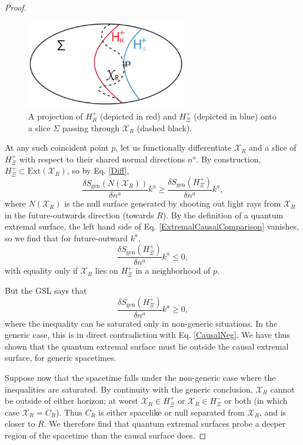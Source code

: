 \documentclass[12pt]{article}
\theoremstyle{remark}
\numberwithin{equation}{section}
\numberwithin{equation}{section}
\begin{document}
\begin{proof}
\begin{figure}[t]
\begin{center}
\includegraphics[width=7cm]{CausalSurfaceDefv2.pdf} 
\caption{\small{A projection of $H^{+}_{R}$ (depicted in red) and $H^{+}_{\Xi}$ (depicted in blue) onto a slice $\Sigma$ passing through $\mathcal{X}_{R}$ (dashed black).}}
\label{Daleth}
\end{center}
\end{figure}
At any such coincident point $p$, let us functionally differentiate $\mathcal{X}_{R}$ and a slice of $H^+_\Xi$ with respect to their shared normal directions $n^{a}$.  By construction, $H^+_\Xi\subset \text{Ext}(\mathcal{X}_{R})$, so by Eq. \ref{Diff},
\begin{equation}\frac{\delta S_{\text{gen}} (N(\mathcal{X}_{R}))}{\delta n^{a}}k^{a} \geq \frac{\delta S_{\text{gen}} (H^+_\Xi)}{\delta n^{a}}k^{a},  \label{ExtremalCausalComparison}
\end{equation}
where $N(\mathcal{X}_{R})$ is the null surface generated by shooting out light rays from $\mathcal{X}_{R}$ in the future-outwards direction (towards $R$).  By the definition of a quantum extremal surface, the left hand side of Eq. \ref{ExtremalCausalComparison} vanishes, so we find that for future-outward $k^a$,
\begin{equation}
\frac{\delta  S_{\text{gen}} (H^+_\Xi)}{\delta n^{a}}k^{a} \leq 0 \label{CausalNeg},
\end{equation}
with equality only if $\mathcal{X}_{R}$ lies on $H^+_\Xi$ in a neighborhood of $p$.

But the GSL says that
\begin{equation} \frac{\delta  S_{\text{gen}} (H^+_\Xi)}{\delta n^{a}}k^{a} \geq  0, \label{CausalFut} \end{equation}
where the inequality can be saturated only in non-generic situations.  In the generic case, this is in direct contradiction with Eq. \ref{CausalNeg}.  We have thus shown that the quantum extremal surface must lie outside the causal extremal surface, for generic spacetimes.

Suppose now that the spacetime falls under the non-generic case where the inequalities are saturated.  By continuity with the generic conclusion, $\mathcal{X}_{R}$ cannot be outside of either horizon; at worst $\mathcal{X}_{R} \in H^+_\Xi$ or $\mathcal{X}_{R} \in H^-_\Xi$ or both (in which case $\mathcal{X}_{R} = C_R$).  Thus $C_R$ is either spacelike or null separated from $\mathcal{X}_{R}$, and is closer to $R$.  We therefore find that quantum extremal surfaces probe a deeper region of the spacetime than the causal surface does.


\end{proof}
\end{document}
